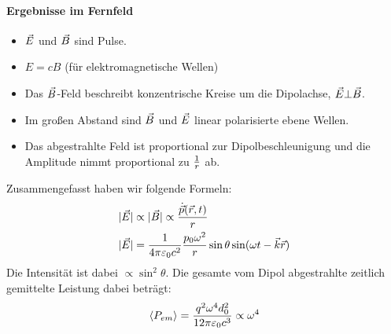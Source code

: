 \paragraph{Ergebnisse im Fernfeld}
\begin{itemize}
	\item $\vec{E}$ und $\vec{B}$ sind Pulse.
	\item $E=cB$ (für elektromagnetische Wellen)
	\item Das $\vec{B}$-Feld beschreibt konzentrische Kreise um die
      Dipolachse, $\vec{E}\bot\vec{B}$.
	\item Im großen Abstand sind $\vec{B}$ und $\vec{E}$ linear
      polarisierte ebene Wellen.
	\item Das abgestrahlte Feld ist proportional zur
      Dipolbeschleunigung und die Amplitude nimmt proportional zu
      $\frac{1}{r}$ ab.
\end{itemize}
Zusammengefasst haben wir folgende Formeln:
\begin{align*}
  \vert \vec{E}\vert
  &\propto\vert\vec{B}\vert\propto\frac{\dot{\vec{p}}(\vec{r},t)}{r}\\
  \vert\vec{E}\vert
  &=\frac{1}{4\pi\varepsilon_0 c^2} \frac{p_0\omega^2}{r}
    \sin\theta \sin(\omega t-\vec{k}\vec{r})
\end{align*}
Die Intensität ist dabei $\propto\sin^2\theta$. Die gesamte vom Dipol
abgestrahlte zeitlich gemittelte Leistung dabei beträgt: 
\begin{align*}
	\langle P_{em}\rangle
  =\frac{q^2\omega^4 d_0^2}{12\pi\varepsilon_0 c^3}
  \propto\omega^4 
\end{align*}


